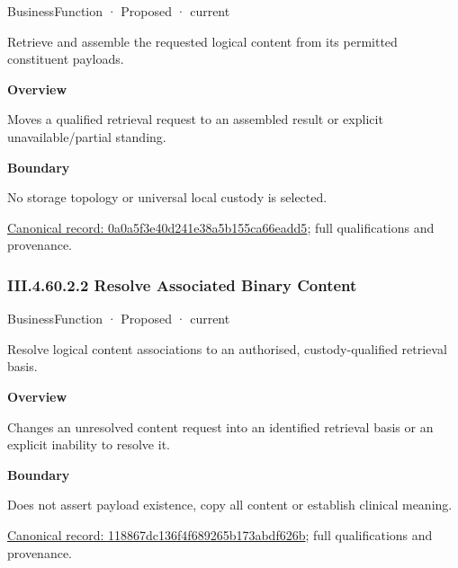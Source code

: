 \label{element:0a0a5f3e40d241e38a5b155ca66eadd5}
{\small BusinessFunction · Proposed · current}\par

Retrieve and assemble the requested logical content from its permitted constituent payloads.



\textbf{Overview}



Moves a qualified retrieval request to an assembled result or explicit unavailable/partial standing.



\textbf{Boundary}



No storage topology or universal local custody is selected.


{\footnotesize \href{../../../../continuum/business/business-function/0a0a5f3e40d241e38a5b155ca66eadd5.md}{Canonical record: 0a0a5f3e40d241e38a5b155ca66eadd5}; full qualifications and provenance.}\par
\subsubsection*{III.4.60.2.2 Resolve Associated Binary Content}
\label{navigation:III.4.60.2.2}

\label{element:118867dc136f4f689265b173abdf626b}
{\small BusinessFunction · Proposed · current}\par

Resolve logical content associations to an authorised, custody-qualified retrieval basis.



\textbf{Overview}



Changes an unresolved content request into an identified retrieval basis or an explicit inability to resolve it.



\textbf{Boundary}



Does not assert payload existence, copy all content or establish clinical meaning.


{\footnotesize \href{../../../../continuum/business/business-function/118867dc136f4f689265b173abdf626b.md}{Canonical record: 118867dc136f4f689265b173abdf626b}; full qualifications and provenance.}\par
